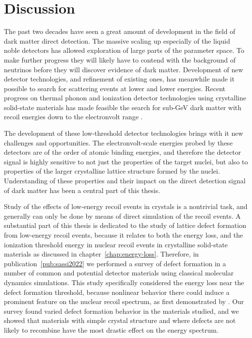 \documentclass[b5paper, 10pt, twoside]{book}
\begin{document}
\chapter{Discussion}

The past two decades have seen a great amount of development in the field of dark matter direct detection. The massive scaling up especially of the liquid noble detectors has allowed exploration of large parts of the parameter space. To make further progress they will likely have to contend with the background of neutrinos before they will discover evidence of dark matter. Development of new detector technologies, and refinement of existing ones, has meanwhile made it possible to search for scattering events at lower and lower energies. Recent progress on thermal phonon and ionization detector technologies using crystalline solid-state materials has made feasible the search for sub-GeV dark matter with recoil energies down to the electronvolt range \parencites{RomaniEtAl2018, CrislerEtAl2018, EDELWEISS2020}.

The development of these low-threshold detector technologies brings with it new challenges and opportunities. The electronvolt-scale energies probed by these detectors are of the order of atomic binding energies, and therefore the detector signal is highly sensitive to not just the properties of the target nuclei, but also to properties of the larger crystalline lattice structure formed by the nuclei. Understanding of these properties and their impact on the direct detection signal of dark matter has been a central part of this thesis.

Study of the effects of low-energy recoil events in crystals is a nontrivial task, and generally can only be done by means of direct simulation of the recoil events. A substantial part of this thesis is dedicated to the study of lattice defect formation from low-energy recoil events, because it relates to both the energy loss, and the ionization threshold energy in nuclear recoil events in crystalline solid-state materials as discussed in chapter~\ref{chap:energy-loss}. Therefore, in publication~\ref{pub:sassi2022} we performed a survey of defect formation in a number of common and potential detector materials using classical molecular dynamics simulations. This study specifically considered the energy loss near the defect formation threshold, because nonlinear behavior there could induce a prominent feature on the nuclear recoil spectrum, as first demonstrated by \textcite{KadribasicEtAl2020}. Our survey found varied defect formation behavior in the materials studied, and we showed that materials with simple crystal structure and where defects are not likely to recombine have the most drastic effect on the energy spectrum.
\end{document}

